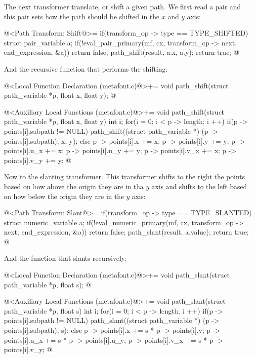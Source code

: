The next transformer translate, or shift a given path. We first read a
pair and this pair sets how the path should be shifted in the $x$ and
$y$ axis:

\iniciocodigo
@<Path Transform: Shift@>=
if(transform_op -> type == TYPE_SHIFTED){
  struct pair_variable a;
  if(!eval_pair_primary(mf, cx, transform_op -> next, end_expression,
                          &a))
    return false;
  path_shift(result, a.x, a.y);  
  return true;
}
@
\fimcodigo

And the recursive function that performs the shifting:

\iniciocodigo
@<Local Function Declaration (metafont.c)@>+=
void path_shift(struct path_variable *p, float x, float y);
@
\fimcodigo

\iniciocodigo
@<Auxiliary Local Functions (metafont.c)@>+=
void path_shift(struct path_variable *p, float x, float y){
  int i;
  for(i = 0; i < p -> length; i ++){
    if(p -> points[i].subpath != NULL)
      path_shift((struct path_variable *) (p -> points[i].subpath), x, y);
    else{
      p -> points[i].x += x;
      p -> points[i].y += y;
      p -> points[i].u_x += x;
      p -> points[i].u_y += y;
      p -> points[i].v_x += x;
      p -> points[i].v_y += y;
    }
  }
}
@
\fimcodigo

Now to the slanting transformer. This transformer shifts to the right
the points based on how above the origin they are in tha $y$ axis and
shifts to the left based on how below the origin they are in the $y$
axis:

\iniciocodigo
@<Path Transform: Slant@>=
if(transform_op -> type == TYPE_SLANTED){
  struct numeric_variable a;
  if(!eval_numeric_primary(mf, cx, transform_op -> next, end_expression,
                          &a))
    return false;
  path_slant(result, a.value);  
  return true;
}
@
\fimcodigo

And the function that slants recursively:

\iniciocodigo
@<Local Function Declaration (metafont.c)@>+=
void path_slant(struct path_variable *p, float s);
@
\fimcodigo

\iniciocodigo
@<Auxiliary Local Functions (metafont.c)@>+=
void path_slant(struct path_variable *p, float s){
  int i;
  for(i = 0; i < p -> length; i ++){
    if(p -> points[i].subpath != NULL)
      path_slant((struct path_variable *) (p -> points[i].subpath), s);
    else{
      p -> points[i].x += s * p -> points[i].y;
      p -> points[i].u_x += s * p -> points[i].u_y;
      p -> points[i].v_x += s * p -> points[i].v_y;
    }
  }
}
@
\fimcodigo


